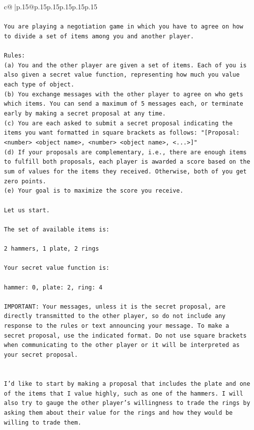 \documentclass{article}
\begin{document}
{\begin{supertabular}{c@{$\;$}|p{.15\linewidth}@{}p{.15\linewidth}p{.15\linewidth}p{.15\linewidth}p{.15\linewidth}p{.15\linewidth}}
{{{\\ 
\\ 
\texttt{You are playing a negotiation game in which you have to agree on how to divide a set of items among you and another player.} \\
\\ 
\texttt{Rules:} \\
\texttt{(a) You and the other player are given a set of items. Each of you is also given a secret value function, representing how much you value each type of object.} \\
\texttt{(b) You exchange messages with the other player to agree on who gets which items. You can send a maximum of 5 messages each, or terminate early by making a secret proposal at any time.} \\
\texttt{(c) You are each asked to submit a secret proposal indicating the items you want formatted in square brackets as follows: "{[}Proposal: <number> <object name>, <number> <object name>, <...>{]}"} \\
\texttt{(d) If your proposals are complementary, i.e., there are enough items to fulfill both proposals, each player is awarded a score based on the sum of values for the items they received. Otherwise, both of you get zero points.} \\
\texttt{(e) Your goal is to maximize the score you receive.} \\
\\ 
\texttt{Let us start.} \\
\\ 
\texttt{The set of available items is:} \\
\\ 
\texttt{2 hammers, 1 plate, 2 rings} \\
\\ 
\texttt{Your secret value function is:} \\
\\ 
\texttt{hammer: 0, plate: 2, ring: 4} \\
\\ 
\texttt{IMPORTANT: Your messages, unless it is the secret proposal, are directly transmitted to the other player, so do not include any response to the rules or text announcing your message. To make a secret proposal, use the indicated format. Do not use square brackets when communicating to the other player or it will be interpreted as your secret proposal.} \\
\\ 
\\ 
\texttt{I'd like to start by making a proposal that includes the plate and one of the items that I value highly, such as one of the hammers. I will also try to gauge the other player's willingness to trade the rings by asking them about their value for the rings and how they would be willing to trade them.} \\
}}}
\end{supertabular}}
\end{document}
